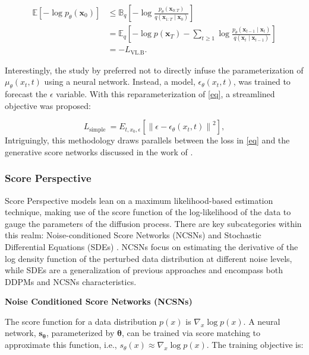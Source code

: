 \documentclass[preprint,12pt,authoryear]{elsarticle}
\begin{document}
\begin{equation}
	\label{eq}
	\begin{aligned}
		\mathbb{E}\left[-\log p_\theta\left(\mathbf{x}_0\right)\right] & \leq \mathbb{B}_q\left[-\log \frac{p_\theta\left(\mathbf{x}_{0: T}\right)}{q\left(\mathbf{x}_{1: T} \mid \mathbf{x}_0\right)}\right] \\
		&=\mathbb{E}_q\left[-\log p\left(\mathbf{x}_T\right)-\sum_{t \geq 1} \log \frac{p_\theta\left(\mathbf{x}_{t-1} \mid \mathbf{x}_t\right)}{q\left(\mathbf{x}_t \mid \mathbf{x}_{t-1}\right)}\right] \\
		&=-L_{\mathrm{VL} . \mathrm{B}} .
	\end{aligned}
\end{equation}

Interestingly, the study by \cite{42_Diffusion} preferred not to directly infuse the parameterization of \(\mu_\theta\left(x_t, t\right)\) using a neural network. Instead, a model, \(\epsilon_\theta\left(x_t, t\right)\), was trained to forecast the \(\epsilon\) variable. With this reparameterization of \ref{eq}, a streamlined objective was proposed:

\begin{equation}
	L_{\text {simple }}=E_{t, x_0, \epsilon}\left[\left\|\epsilon-\epsilon_\theta\left(x_t, t\right)\right\|^2\right] ,
\end{equation}
Intriguingly, this methodology draws parallels between the loss in \ref{eq} and the generative score networks discussed in the work of \cite{77_diffusion}.

\subsubsection{Score Perspective}
Score Perspective models lean on a maximum likelihood-based estimation technique, making use of the score function of the log-likelihood of the data to gauge the parameters of the diffusion process. There are key subcategories within this realm: Noise-conditioned Score Networks (NCSNs) \cite{77_diffusion} and Stochastic Differential Equations (SDEs) \cite{78_score_based}. NCSNs focus on estimating the derivative of the log density function of the perturbed data distribution at different noise levels, while SDEs are a generalization of previous approaches and encompass both DDPMs and NCSNs characteristics. \cite{84_diffusion_survey}

\textbf{Noise Conditioned Score Networks (NCSNs)}

The score function for a data distribution $p(x)$ is $\nabla_x \log p(x)$. A neural network, $\mathbf{s}_{\boldsymbol{\theta}}$, parameterized by $\boldsymbol{\theta}$, can be trained via score matching to approximate this function, i.e., $s_\theta(x) \approx \nabla_x \log p(x)$. The training objective is:
\end{document}
